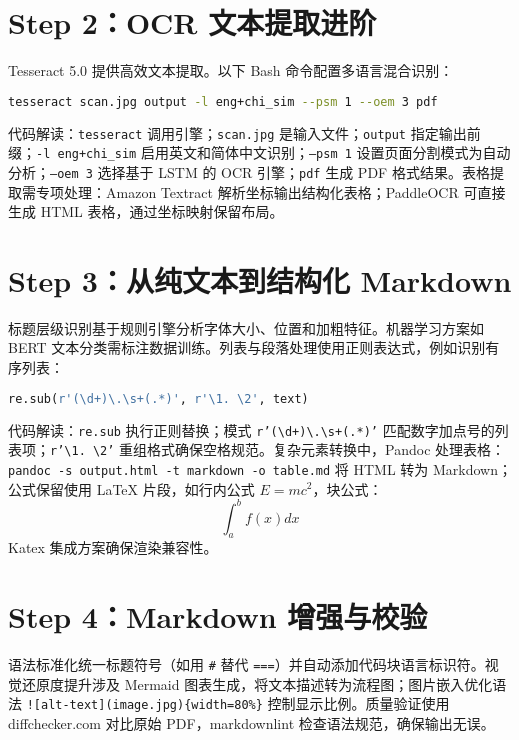\section{Step 2：OCR 文本提取进阶}
Tesseract 5.0 提供高效文本提取。以下 Bash 命令配置多语言混合识别：\par
\begin{lstlisting}[language=bash]
tesseract scan.jpg output -l eng+chi_sim --psm 1 --oem 3 pdf
\end{lstlisting}
代码解读：\texttt{tesseract} 调用引擎；\texttt{scan.jpg} 是输入文件；\texttt{output} 指定输出前缀；\texttt{-l eng+chi\_{}sim} 启用英文和简体中文识别；\texttt{--psm 1} 设置页面分割模式为自动分析；\texttt{--oem 3} 选择基于 LSTM 的 OCR 引擎；\texttt{pdf} 生成 PDF 格式结果。表格提取需专项处理：Amazon Textract 解析坐标输出结构化表格；PaddleOCR 可直接生成 HTML 表格，通过坐标映射保留布局。\par
\section{Step 3：从纯文本到结构化 Markdown}
标题层级识别基于规则引擎分析字体大小、位置和加粗特征。机器学习方案如 BERT 文本分类需标注数据训练。列表与段落处理使用正则表达式，例如识别有序列表：\par
\begin{lstlisting}[language=python]
re.sub(r'(\d+)\.\s+(.*)', r'\1. \2', text) 
\end{lstlisting}
代码解读：\texttt{re.sub} 执行正则替换；模式 \texttt{r'(\textbackslash{}d+)\textbackslash{}.\textbackslash{}s+(.*)'} 匹配数字加点号的列表项；\texttt{r'\textbackslash{}1. \textbackslash{}2'} 重组格式确保空格规范。复杂元素转换中，Pandoc 处理表格：\texttt{pandoc -s output.html -t markdown -o table.md} 将 HTML 转为 Markdown；公式保留使用 LaTeX 片段，如行内公式 $E = mc^2$，块公式：
$$ \int_{a}^{b} f(x)  dx $$
Katex 集成方案确保渲染兼容性。\par
\section{Step 4：Markdown 增强与校验}
语法标准化统一标题符号（如用 \texttt{\#{}} 替代 \texttt{===}）并自动添加代码块语言标识符。视觉还原度提升涉及 Mermaid 图表生成，将文本描述转为流程图；图片嵌入优化语法 \texttt{![alt-text](image.jpg)\{{}width=80\%{}\}{}} 控制显示比例。质量验证使用 diffchecker.com 对比原始 PDF，markdownlint 检查语法规范，确保输出无误。\par
